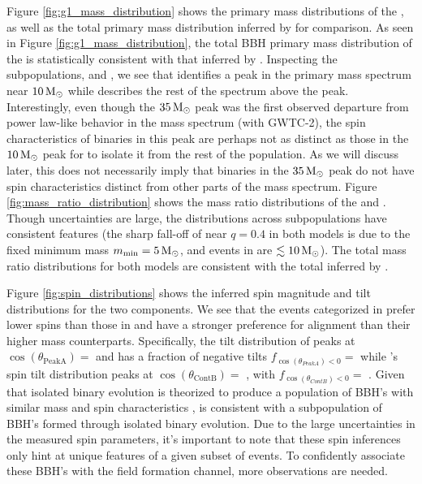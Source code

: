 Figure \ref{fig:g1_mass_distribution} shows the primary mass distributions of the \base{}, as well as the total primary mass distribution inferred by \brucepaper{} for comparison. As seen in Figure \ref{fig:g1_mass_distribution}, the total BBH primary mass distribution of the \base{} is statistically consistent with that inferred by \brucepaper{}. Inspecting the subpopulations, \first{} and \contB{}, we see that \first{} identifies a peak in the primary mass spectrum near $10{\,\rm M}_\odot$ while \contB{} describes the rest of the spectrum above the peak. Interestingly, even though the $35{\,\rm M}_\odot$ peak was the first observed departure from power law-like behavior in the mass spectrum (with GWTC-2), the spin characteristics of binaries in this peak are perhaps not as distinct as those in the $10{\,\rm M}_\odot$ peak for \first{} to isolate it from the rest of the population. As we will discuss later, this does not necessarily imply that binaries in the $35{\,\rm M}_\odot$ peak do not have spin characteristics distinct from other parts of the mass spectrum. Figure \ref{fig:mass_ratio_distribution} shows the mass ratio distributions of the \base{} and \comp{}. Though uncertainties are large, the distributions across subpopulations have consistent features (the sharp fall-off of \first{} near $q=0.4$ in both models is due to the fixed minimum mass $m_\text{min}=5{\,\rm M}_\odot$, and events in \first{} are $\lesssim10{\,\rm M}_\odot$). The total mass ratio distributions for both models are consistent with the total inferred by \brucepaper.

Figure \ref{fig:spin_distributions} shows the inferred spin magnitude and tilt distributions for the two components. We see that the events categorized in \first{} prefer lower spins than those in \contB{} and have a stronger preference for alignment than their higher mass counterparts. Specifically, the tilt distribution of \first{} peaks at $\cos(\theta_\text{PeakA})=$ \result{$\CIPlusMinus{\macros[CosTilt][Base][PeakA][max]}$} and has a fraction of negative tilts $f_{\cos(\theta_{PeakA}) < 0}=$\result{$\CIPlusMinus{\macros[CosTilt][Base][PeakA][negfrac]}$} while \contB{}'s spin tilt distribution peaks at $\cos(\theta_\text{ContB})=$ \result{$\CIPlusMinus{\macros[CosTilt][Base][ContinuumB][max]}$}, with $f_{\cos(\theta_{ContB}) < 0} = $ \result{$\CIPlusMinus{\macros[CosTilt][Base][ContinuumB][negfrac]}$}. Given that isolated binary evolution is theorized to produce a population of BBH's with similar mass and spin characteristics , \first{} is consistent with a subpopulation of BBH's formed through isolated binary evolution. Due to the large uncertainties in the measured spin parameters, it's important to note that these spin inferences only hint at unique features of a given subset of events. To confidently associate these BBH's with the field formation channel, more observations are needed.

